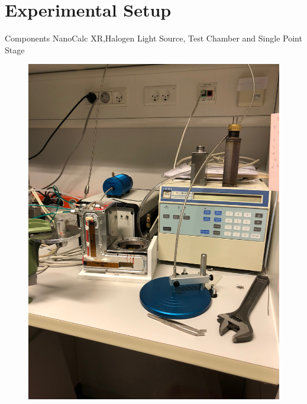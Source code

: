 \documentclass[10pt]{beamer}
\begin{document}
	\section{Experimental Setup}
	
	\begin{frame}{Components}
	NanoCalc XR,Halogen Light Source, Test Chamber and Single Point Stage
	
	\begin{minipage}{0.47\textwidth}
	\begin{figure}
	\includegraphics[scale=0.04,angle=-90]{setup1.JPG}
	\end{figure}
	\end{minipage}
	\begin{minipage}{0.5\textwidth}
	\begin{figure}

\end{figure}
\end{minipage}
\end{frame}
\end{document}
